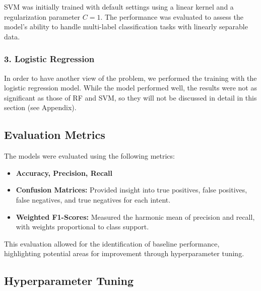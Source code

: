         
            SVM was initially trained with default settings using a linear kernel and a regularization parameter \( C = 1 \). The performance was evaluated to assess the model's ability to handle multi-label classification tasks with linearly separable data.

        \subsubsection*{3. Logistic Regression \\}
        
        
            In order to have another view of the problem, we performed the training with the logistic regression model. While the model performed well, the results were not as significant as those of RF and SVM, so they will not be discussed in detail in this section (see Appendix).

    \subsection{Evaluation Metrics}
    
        The models were evaluated using the following metrics:
        
        \begin{itemize}
        
            \item \textbf{Accuracy, Precision, Recall}
            
            \item \textbf{Confusion Matrices:} Provided insight into true positives, false positives, false negatives, and true negatives for each intent.
            
            \item \textbf{Weighted F1-Scores:} Measured the harmonic mean of precision and recall, with weights proportional to class support.
        
        \end{itemize}

        This evaluation allowed for the identification of baseline performance, highlighting potential areas for improvement through hyperparameter tuning.

    \subsection{Hyperparameter Tuning}
    
